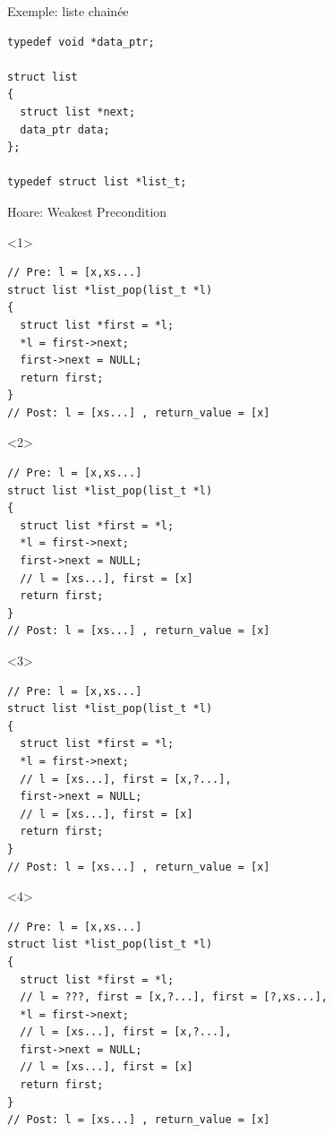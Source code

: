\documentclass[hyperref={pdfpagelabels=false}]{beamer}
\begin{document}
\begin{frame}[fragile]{Exemple: liste chainée}
  \begin{verbatim}
typedef void *data_ptr;

struct list
{
  struct list *next;
  data_ptr data;
};

typedef struct list *list_t;
  \end{verbatim}

\end{frame}

\begin{frame}[fragile]{Hoare: Weakest Precondition}
  \begin{onlyenv}<1>
    \begin{verbatim}
// Pre: l = [x,xs...]
struct list *list_pop(list_t *l)
{
  struct list *first = *l;
  *l = first->next;
  first->next = NULL;
  return first; 
}
// Post: l = [xs...] , return_value = [x]

    \end{verbatim}
  \end{onlyenv}

  \begin{onlyenv}<2>
    \begin{verbatim}
// Pre: l = [x,xs...]
struct list *list_pop(list_t *l)
{
  struct list *first = *l;
  *l = first->next;
  first->next = NULL;
  // l = [xs...], first = [x]
  return first; 
}
// Post: l = [xs...] , return_value = [x]

    \end{verbatim}
  \end{onlyenv}

  \begin{onlyenv}<3>
    \begin{verbatim}
// Pre: l = [x,xs...]
struct list *list_pop(list_t *l)
{
  struct list *first = *l;
  *l = first->next;
  // l = [xs...], first = [x,?...],
  first->next = NULL;
  // l = [xs...], first = [x]
  return first; 
}
// Post: l = [xs...] , return_value = [x]

    \end{verbatim}
  \end{onlyenv}

  \begin{onlyenv}<4>
    \begin{verbatim}
// Pre: l = [x,xs...]
struct list *list_pop(list_t *l)
{
  struct list *first = *l;
  // l = ???, first = [x,?...], first = [?,xs...],
  *l = first->next;
  // l = [xs...], first = [x,?...],
  first->next = NULL;
  // l = [xs...], first = [x]
  return first; 
}
// Post: l = [xs...] , return_value = [x]


\end{verbatim}
\end{onlyenv}
\end{frame}
\end{document}
